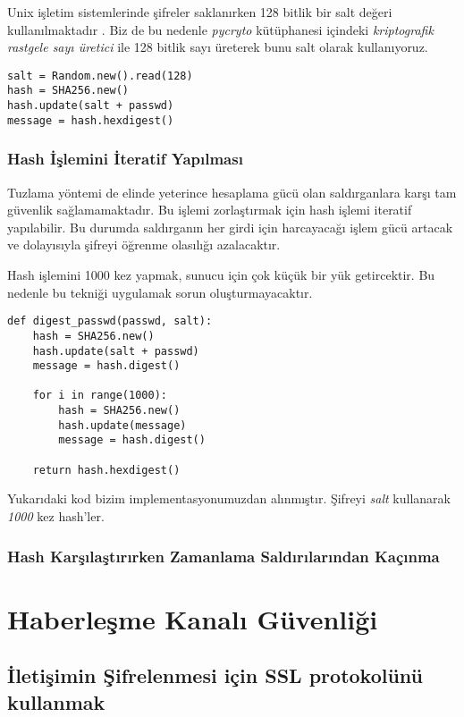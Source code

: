 \documentclass[11pt]{report}
\begin{document}
Unix işletim sistemlerinde şifreler saklanırken 128 bitlik bir salt değeri kullanılmaktadır \cite{unixsalt}. Biz de bu nedenle \emph{pycryto} kütüphanesi içindeki \emph{kriptografik rastgele sayı üretici} ile 128 bitlik sayı üreterek bunu salt olarak kullanıyoruz.

\begin{lstlisting}[caption=Python salt ile SHA256 Kullanımı]
salt = Random.new().read(128)
hash = SHA256.new()
hash.update(salt + passwd)
message = hash.hexdigest()
\end{lstlisting}


\subsection{Hash İşlemini İteratif Yapılması}

Tuzlama yöntemi de elinde yeterince hesaplama gücü olan saldırganlara karşı tam güvenlik sağlamamaktadır. Bu işlemi zorlaştırmak için hash işlemi iteratif yapılabilir. Bu durumda saldırganın her girdi için harcayacağı işlem gücü artacak ve dolayısıyla şifreyi öğrenme olasılığı azalacaktır.

Hash işlemini 1000 kez yapmak, sunucu için çok küçük bir yük getircektir. Bu nedenle bu tekniği uygulamak sorun oluşturmayacaktır.

\begin{lstlisting}[caption=Python iteratif SHA256 Kullanımı]
def digest_passwd(passwd, salt):
    hash = SHA256.new()
    hash.update(salt + passwd)
    message = hash.digest()

    for i in range(1000):
        hash = SHA256.new()
        hash.update(message)
        message = hash.digest()

    return hash.hexdigest()
\end{lstlisting}

Yukarıdaki kod bizim implementasyonumuzdan alınmıştır. Şifreyi \emph{salt} kullanarak \emph{1000} kez hash'ler.
\subsection{Hash Karşılaştırırken Zamanlama Saldırılarından Kaçınma}
\chapter{Haberleşme Kanalı Güvenliği}

\section{İletişimin Şifrelenmesi için SSL protokolünü kullanmak}
\end{document}
